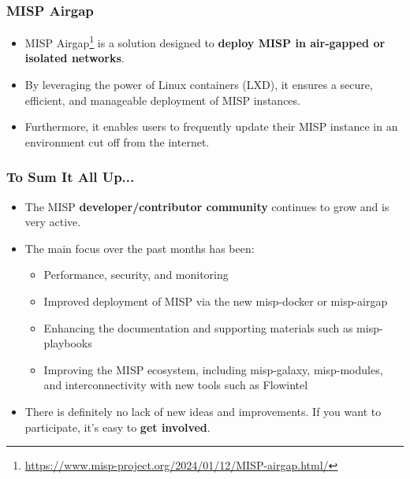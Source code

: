\begin{frame}
  \frametitle{MISP Airgap}
  \begin{itemize}
    \item MISP Airgap\footnote{\url{https://www.misp-project.org/2024/01/12/MISP-airgap.html/}} is a solution designed to \textbf{deploy MISP in air-gapped or isolated networks}.
    \item By leveraging the power of Linux containers (LXD), it ensures a secure, efficient, and manageable deployment of MISP instances.
    \item Furthermore, it enables users to frequently update their MISP instance in an environment cut off from the internet.
  \end{itemize}
\end{frame}

\begin{frame}
  \frametitle{To Sum It All Up...}
  \begin{itemize}
     \item The MISP \textbf{developer/contributor community} continues to grow and is very active.
     \item The main focus over the past months has been:
     \begin{itemize}
          \item Performance, security, and monitoring
          \item Improved deployment of MISP via the new misp-docker or misp-airgap
          \item Enhancing the documentation and supporting materials such as misp-playbooks
          \item Improving the MISP ecosystem, including misp-galaxy, misp-modules, and interconnectivity with new tools such as Flowintel
     \end{itemize}
     \item There is definitely no lack of new ideas and improvements. If you want to participate, it's easy to \textbf{get involved}.
\end{itemize}
\end{frame}

